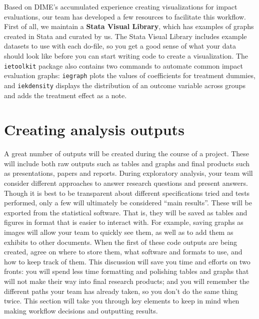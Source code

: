 Based on DIME's accumulated experience creating visualizations for impact evaluations,
our team has developed a few resources to facilitate this workflow.
First of all, we maintain a \textbf{Stata Visual Library},
which has examples of graphs created in Stata and curated by us.
The Stata Visual Library includes example datasets to use with each do-file,
so you get a good sense of what your data should look like
before you can start writing code to create a visualization.
The \texttt{ietoolkit} package also contains two commands to automate
common impact evaluation graphs:
\texttt{iegraph} plots the values of coefficients for treatment dummies,
and \texttt{iekdensity} displays the distribution of an outcome variable
across groups and adds the treatment effect as a note.


\section{Creating analysis outputs}

A great number of outputs will be created during the course of a project.
These will include both raw outputs such as tables and graphs
and final products such as presentations, papers and reports.
During exploratory analysis, your team will consider different approaches
to answer research questions and present answers.
Though it is best to be transparent about different
specifications tried and tests performed,
only a few will ultimately be considered ``main results''.
These will be exported from the statistical software.
That is, they will be saved as tables and figures in format that is easier to interact with.
For example, saving graphs as images will allow your team to quickly see them,
as well as to add them as exhibits to other documents.
When the first of these code outputs are being created, agree on where to store them,
what software and formats to use, and how to keep track of them.
This discussion will save you time and efforts on two fronts:
you will spend less time formatting and polishing tables and graphs that
will not make their way into final research products;
and you will remember the different paths your team has already
taken, so you don't do the same thing twice.
This section will take you through key elements to keep in mind
when making workflow decisions and outputting results.


